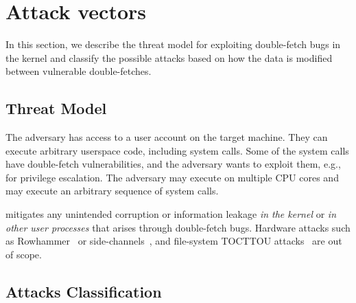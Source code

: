 \documentclass[letterpaper,twocolumn,10pt, anonymous]{article}
\begin{document}
\section{Attack vectors}
\label{sec:threats}

In this section, we describe the threat model for exploiting double-fetch
bugs in the kernel and classify the possible attacks based on how the 
data is modified between vulnerable double-fetches.

\subsection{Threat Model}
\label{sec:threatmodel}

The adversary has access to a user account on the target machine. They can
execute arbitrary userspace code, including system calls. Some of the system 
calls have double-fetch vulnerabilities, and the adversary wants to exploit them,
e.g., for privilege escalation.
The adversary may execute on multiple CPU cores and may execute an arbitrary 
sequence of system calls. 

\tiktok mitigates any unintended corruption or information leakage \emph{in the kernel}
or \emph{in other user processes} that arises through double-fetch bugs. 
Hardware attacks such as Rowhammer~\cite{mutlu2019rowhammer}
or side-channels~\cite{kocher2019spectre}, and file-system TOCTTOU
attacks~\cite{payer2012protecting, pu2006methodical, wei2010modeling,
tsafrir2008portably} are out of scope.

\subsection{Attacks Classification}
\label{sec:attacks}
\end{document}
